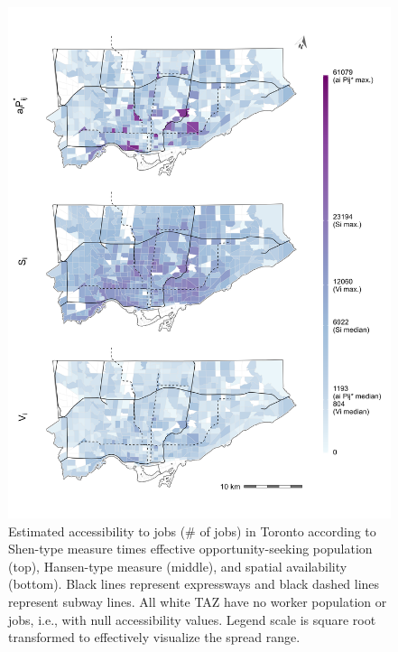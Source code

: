 \documentclass[]{elsarticle} %
\begin{document}
\begin{figure}
\includegraphics[width=1\linewidth]{images/access-job-Toronto-plot} \caption{\label{fig:absolute-accessibility-plot}Estimated accessibility to jobs (\# of jobs) in Toronto according to Shen-type measure times effective opportunity-seeking population (top), Hansen-type measure (middle), and spatial availability (bottom). Black lines represent expressways and black dashed lines represent subway lines. All white TAZ have no worker population or jobs, i.e., with null accessibility values. Legend scale is square root transformed to effectively visualize the spread range.}\label{fig:absolute-accessibility-plot}
\end{figure}
\end{document}

